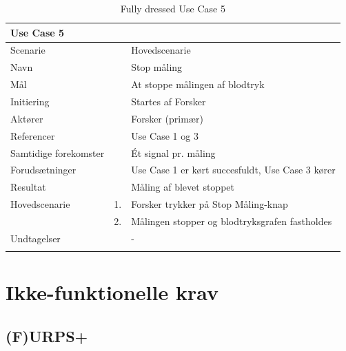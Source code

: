 \newpage
\begin{longtabu} to  %
	{\large \textbf{Use Case 5}} && \\
	\toprule
	Scenarie	 	&& Hovedscenarie\\
	Navn 			&& Stop måling \\
	Mål 			&& At stoppe målingen af blodtryk\\
	Initiering 		&& Startes af Forsker\\
	Aktører 		&& Forsker (primær)\\
	Referencer 		&& Use Case 1 og 3  \\
	Samtidige forekomster  &&  Ét signal pr. måling\\
	Forudsætninger 	&& Use Case 1 er kørt succesfuldt, Use Case 3 kører\\
	Resultat 		&& Måling af blevet stoppet\\ \midrule
	Hovedscenarie &    1. &		Forsker trykker på Stop Måling-knap\\[-1ex] 
	&    2. &   Målingen stopper og blodtryksgrafen fastholdes \\ \midrule	 	
	Undtagelser &    & - 	\\ \bottomrule
	\caption{Fully dressed Use Case 5}
	\label{UC5}
\end{longtabu}

\section{Ikke-funktionelle krav}


\subsection{(F)URPS+}

